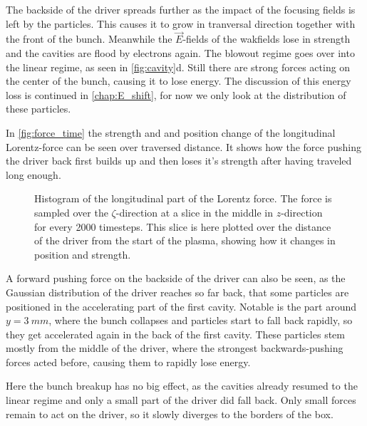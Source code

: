 \documentclass[bachelor_thesis]{subfiles}
\begin{document}
The backside of the driver spreads further as the impact of the focusing fields is left by the particles. This causes it to grow in tranversal direction together with the front of the bunch. 
Meanwhile the $\vec{E}$-fields of the wakfields lose in strength and the cavities are flood by electrons again. The blowout regime goes over into the linear regime, as seen in \autoref{fig:cavity}d.
Still there are strong forces acting on the center of the bunch, causing it to lose energy. The discussion of this energy loss is continued in \autoref{chap:E_shift}, for now we only look at the distribution of these particles.

In \autoref{fig:force_time} the strength and and position change of the longitudinal Lorentz-force can be seen over traversed distance. It shows how the force pushing the driver back first builds up and then loses it's strength after having traveled long enough.
\begin{figure}
	\centering
	\missingfigure{}
	\caption{Histogram of the longitudinal part of the Lorentz force. The force is sampled over the $\zeta$-direction at a slice in the middle in $z$-direction for every 2000 timesteps. This slice is here plotted over the distance of the driver from the start of the plasma, showing how it changes in position and strength.}
	\label{fig:force_time}
\end{figure}
A forward pushing force on the backside of the driver can also be seen, as the Gaussian distribution of the driver reaches so far back, that some particles are positioned in the accelerating part of the first cavity.
Notable is the part around $y=\qty{3}{mm}$, where the bunch collapses and particles start to fall back rapidly, so they get accelerated again in the back of the first cavity. These particles stem mostly from the middle of the driver,
where the strongest backwards-pushing forces acted before, causing them to rapidly lose energy. 

Here the bunch breakup has no big effect, as the cavities already resumed to the linear regime and only a small part of the driver did fall back. Only small forces remain to act on the driver, so it slowly diverges to the borders of the box.
\end{document}
